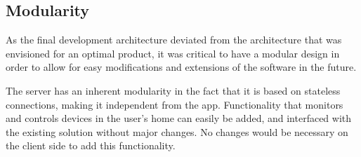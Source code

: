 \subsection{Modularity}
\label{sec:modularity}
As the final development architecture deviated from the architecture that was envisioned for an optimal product, it was critical to have a modular design in order to allow for easy modifications and extensions of the software in the future. 

The server has an inherent modularity in the fact that it is based on stateless connections, making it independent from the app. Functionality that monitors and controls devices in the user's home can easily be added, and interfaced with the existing solution without major changes. No changes would be necessary on the client side to add this functionality.

